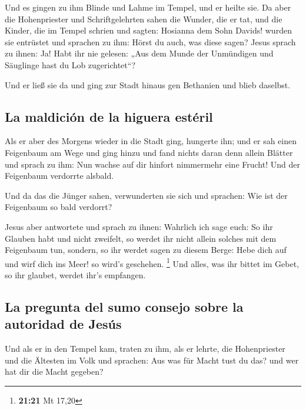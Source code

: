  Und es gingen zu ihm Blinde und Lahme im Tempel, und er
heilte sie.  Da aber die Hohenpriester und
Schriftgelehrten sahen die Wunder, die er tat, und die Kinder, die im
Tempel schrien und sagten: Hosianna dem Sohn Davids! wurden sie
entrüstet  und sprachen zu ihm: Hörst du auch, was diese
sagen? Jesus sprach zu ihnen: Ja! Habt ihr nie gelesen: „Aus dem Munde
der Unmündigen und Säuglinge hast du Lob zugerichtet``?

 Und er ließ sie da und ging zur Stadt hinaus gen
Bethanien und blieb daselbst.

\hypertarget{la-maldiciuxf3n-de-la-higuera-estuxe9ril}{%
\subsection{La maldición de la higuera
estéril}\label{la-maldiciuxf3n-de-la-higuera-estuxe9ril}}

 Als er aber des Morgens wieder in die Stadt ging,
hungerte ihn;  und er sah einen Feigenbaum am Wege und
ging hinzu und fand nichts daran denn allein Blätter und sprach zu ihm:
Nun wachse auf dir hinfort nimmermehr eine Frucht! Und der Feigenbaum
verdorrte alsbald.

 Und da das die Jünger sahen, verwunderten sie sich und
sprachen: Wie ist der Feigenbaum so bald verdorrt?

 Jesus aber antwortete und sprach zu ihnen: Wahrlich ich
sage euch: So ihr Glauben habt und nicht zweifelt, so werdet ihr nicht
allein solches mit dem Feigenbaum tun, sondern, so ihr werdet sagen zu
diesem Berge: Hebe dich auf und wirf dich ins Meer! so wird's geschehen.
\footnote{\textbf{21:21} Mt 17,20}  Und alles, was ihr
bittet im Gebet, so ihr glaubet, werdet ihr's empfangen.

\hypertarget{la-pregunta-del-sumo-consejo-sobre-la-autoridad-de-jesuxfas}{%
\subsection{La pregunta del sumo consejo sobre la autoridad de
Jesús}\label{la-pregunta-del-sumo-consejo-sobre-la-autoridad-de-jesuxfas}}

 Und als er in den Tempel kam, traten zu ihm, als er
lehrte, die Hohenpriester und die Ältesten im Volk und sprachen: Aus was
für Macht tust du das? und wer hat dir die Macht gegeben?

